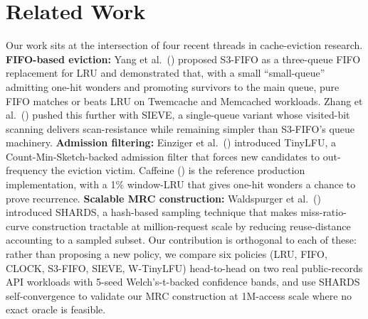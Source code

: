 \section{Related Work}\label{sec:related}

Our work sits at the intersection of four recent threads in cache-eviction
research. \textbf{FIFO-based eviction:} Yang et al.\ (\cite{yang2023fifo})
proposed S3-FIFO as a three-queue FIFO replacement for LRU and demonstrated
that, with a small ``small-queue'' admitting one-hit wonders and promoting
survivors to the main queue, pure FIFO matches or beats LRU on Twemcache and
Memcached workloads. Zhang et al.\ (\cite{zhang2024sieve}) pushed this further
with SIEVE, a single-queue variant whose visited-bit scanning delivers
scan-resistance while remaining simpler than S3-FIFO's queue machinery.
\textbf{Admission filtering:} Einziger et al.\ (\cite{einziger2017tinylfu})
introduced TinyLFU, a Count-Min-Sketch-backed admission filter that forces new
candidates to out-frequency the eviction victim. Caffeine
(\cite{caffeine2024}) is the reference production implementation, with a 1\%
window-LRU that gives one-hit wonders a chance to prove recurrence.
\textbf{Scalable MRC construction:} Waldspurger et al.\
(\cite{waldspurger2015shards}) introduced SHARDS, a hash-based sampling
technique that makes miss-ratio-curve construction tractable at
million-request scale by reducing reuse-distance accounting to a sampled
subset. Our contribution is orthogonal to each of these: rather than proposing
a new policy, we compare six policies (LRU, FIFO, CLOCK, S3-FIFO, SIEVE,
W-TinyLFU) head-to-head on two real public-records API workloads with 5-seed
Welch's-t-backed confidence bands, and use SHARDS self-convergence to
validate our MRC construction at 1M-access scale where no exact oracle is
feasible.
